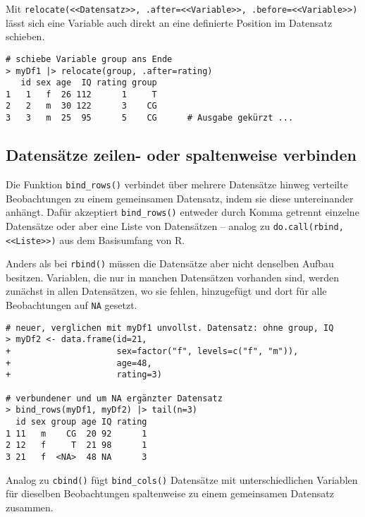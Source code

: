 Mit \lstinline!relocate(<<Datensatz>>, .after=<<Variable>>, .before=<<Variable>>)! lässt sich eine Variable auch direkt an eine definierte Position im Datensatz schieben.
\begin{lstlisting}
# schiebe Variable group ans Ende
> myDf1 |> relocate(group, .after=rating)
   id sex age  IQ rating group
1   1   f  26 112      1     T
2   2   m  30 122      3    CG
3   3   m  25  95      5    CG      # Ausgabe gekürzt ...
\end{lstlisting}

\subsection{Datensätze zeilen- oder spaltenweise verbinden}
\label{sec:dplyr_dfCbind}

Die Funktion \lstinline!bind_rows()! verbindet über mehrere Datensätze hinweg verteilte Beobachtungen zu einem gemeinsamen Datensatz, indem sie diese untereinander anhängt. Dafür akzeptiert \lstinline!bind_rows()! entweder durch Komma getrennt einzelne Datensätze oder aber eine Liste von Datensätzen -- analog zu \lstinline!do.call(rbind, <<Liste>>)! aus dem Basisumfang von R.

Anders als bei \lstinline!rbind()! müssen die Datensätze aber nicht denselben Aufbau besitzen. Variablen, die nur in manchen Datensätzen vorhanden sind, werden zunächst in allen Datensätzen, wo sie fehlen, hinzugefügt und dort für alle Beobachtungen auf \lstinline!NA! gesetzt.
\begin{lstlisting}
# neuer, verglichen mit myDf1 unvollst. Datensatz: ohne group, IQ
> myDf2 <- data.frame(id=21,
+                     sex=factor("f", levels=c("f", "m")),
+                     age=48,
+                     rating=3)

# verbundener und um NA ergänzter Datensatz
> bind_rows(myDf1, myDf2) |> tail(n=3)
  id sex group age IQ rating
1 11   m    CG  20 92      1
2 12   f     T  21 98      1
3 21   f  <NA>  48 NA      3
\end{lstlisting}

Analog zu \lstinline!cbind()! fügt \lstinline!bind_cols()! Datensätze mit unterschiedlichen Variablen für dieselben Beobachtungen spaltenweise zu einem gemeinsamen Datensatz zusammen.

